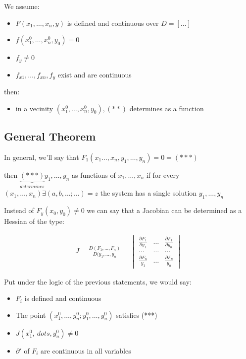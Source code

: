 \documentclass[11pt,fleqn]{book} %
\begin{document}
We assume:
\begin{itemize}
    \item $F(x_1,\dots,x_n, y)$ is defined and continuous over $D = [\dots]$
    \item $f(x_1^0,\dots,x_n^0,y_0) = 0$ \\
    \item $f_y \neq 0$
    \item $f_{x1}, \dots, f_{xn}, f_y$ exist and are continuous
\end{itemize}

then:

\begin{itemize}
    \item in a vecinity $(x_1^0, \dots, x_n^0, y_0),(**)$ determines as a function
\end{itemize}

\subsection{General Theorem}

In general, we'll say that $F_1(x_1 \dots, x_n, y_1, \dots, y_n) = 0 = (***)$

then $\underbrace{(***)}_{determines} y_1, \dots, y_n$ as functions of  $x_1, \dots, x_n$ 
if for every $(x_1, \dots, x_n) \exists (a,b, \dots; \dots) = z$ the system has a single solution
$y_1, \dots, y_n$

Instead of $F_y (x_0, y_0) \neq 0$ we can say that a Jacobian can be determined as a Hessian of the type:

\begin{gather}
    J = \frac{D(F_1, \dots, F_n)}{D(y_1, \dots, y_n} = \begin{vmatrix}
        \frac{\partial F_1}{\partial y_1} & \dots & \frac{\partial F_1}{\partial y_n} \\
        \dots & \dots & \dots \\
        \frac{\partial F_n}{y_1} & \dots & \frac{\partial F_n}{y_n} 
    \end{vmatrix}
\end{gather}

Put under the logic of the previous statements, we would say:

\begin{itemize}
    \item $F_i$ is defined and continuous
    \item The point $(x_1^0, \dots , y_n^0;y_1^0, \dots , y_n^0)$ satisfies (***)
    \item $J(x_1^0, \ dots, y_n^0)\neq 0$ 
    \item $\partial '$ of $F_i$ are continuous in all variables
\end{itemize}
\end{document}
